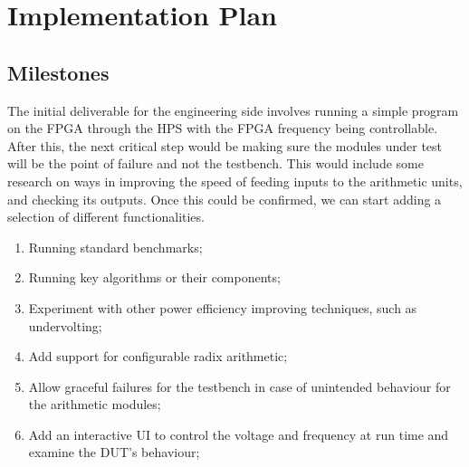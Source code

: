 \section{Implementation Plan}


\subsection{Milestones}
The initial deliverable for the engineering side involves running a simple
program on the FPGA through the HPS with the FPGA frequency being controllable.
After this, the next critical step would be making sure the modules under test
will be the point of failure and not the testbench.
This would include some research on ways in improving the speed of feeding
inputs to the arithmetic units, and checking its outputs.
Once this could be confirmed, we can start adding a selection of different
functionalities.

\begin{enumerate}
  \item Running standard benchmarks;
  \item Running key algorithms or their components;
  \item Experiment with other power efficiency improving techniques,
        such as undervolting;
  \item Add support for configurable radix arithmetic;
  \item Allow graceful failures for the testbench in case of unintended
        behaviour for the arithmetic modules;
  \item Add an interactive UI to control the voltage and frequency at run time
        and examine the DUT’s behaviour;
\end{enumerate}

